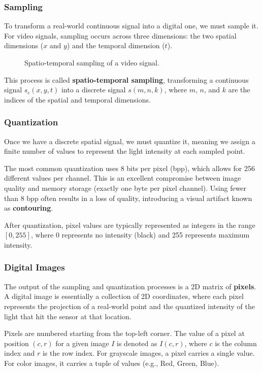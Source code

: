 \subsubsection{Sampling}
To transform a real-world continuous signal into a digital one, we must sample it. 
For video signals, sampling occurs across three dimensions: the two spatial dimensions ($x$ and $y$) and the temporal dimension ($t$).

\begin{figure}[H]
    \centering
    \scalebox{0.8}{
        
    }
     \caption{Spatio-temporal sampling of a video signal.}
\end{figure}

This process is called \textbf{spatio-temporal sampling}, transforming a continuous signal $s_c(x,y,t)$ into a discrete signal $s(m,n,k)$, where $m$, $n$, and $k$ are the indices of the spatial and temporal dimensions.

\subsubsection{Quantization}
Once we have a discrete spatial signal, we must quantize it, meaning we assign a finite number of values to represent the light intensity at each sampled point. 

The most common quantization uses 8 bits per pixel (bpp), which allows for 256 different values per channel. 
This is an excellent compromise between image quality and memory storage (exactly one byte per pixel channel). 
Using fewer than 8 bpp often results in a loss of quality, introducing a visual artifact known as \textbf{contouring}.

After quantization, pixel values are typically represented as integers in the range $[0,255]$, where 0 represents no intensity (black) and 255 represents maximum intensity.

\subsubsection{Digital Images}
The output of the sampling and quantization processes is a 2D matrix of \textbf{pixels}. A digital image is essentially a collection of 2D coordinates, where each pixel represents the projection of a real-world point and the quantized intensity of the light that hit the sensor at that location.

Pixels are numbered starting from the top-left corner. The value of a pixel at position $(c,r)$ for a given image $I$ is denoted as $I(c,r)$, where $c$ is the column index and $r$ is the row index. For grayscale images, a pixel carries a single value. For color images, it carries a tuple of values (e.g., Red, Green, Blue).


